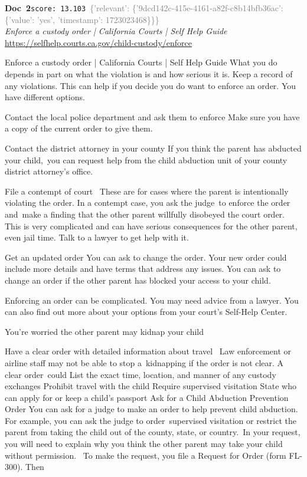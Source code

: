 \documentclass[a4paper,11pt]{article}
\begin{document}
\begin{docenv}
{\footnotesize\textcolor{doccolor}{\textbf{Doc~2}}}\hfill{\tiny\texttt{score:~13.103}}\ {\tiny\textcolor{gray}{\{'relevant': \{'9dcd142c-415e-4161-a82f-c8b14bfb36ac': \{'value': 'yes', 'timestamp': 1723023468\}\}\}}}\\[3pt]
{\small\textit{Enforce a custody order | California Courts | Self Help Guide}}\\[2pt]
{\tiny\url{https://selfhelp.courts.ca.gov/child-custody/enforce}}\\[4pt]
{\footnotesize Enforce a custody order | California Courts | Self Help Guide
What you do depends in part on what the violation is and how serious it is. Keep a record of any violations. This can help if you decide you do want to enforce an order. You have different options.

Contact the local police department and ask them to enforce
Make sure you have a copy of the current order to give them. 

Contact the district attorney in your county
If you think the parent has abducted your child, you can request help from the child abduction unit of your county district attorney's office. 

File a contempt of court 
These are for cases where the parent is intentionally violating the order. In a contempt case, you ask the judge to enforce the order and make a finding that the other parent willfully disobeyed the court order. This is very complicated and can have serious consequences for the other parent, even jail time. Talk to a lawyer to get help with it.

Get an updated order
You can ask to change the order. Your new order could include more details and have terms that address any issues. You can ask to change an order if the other parent has blocked your access to your child. 

Enforcing an order can be complicated. You may need advice from a lawyer. You can also find out more about your options from your court's Self-Help Center.

 You're worried the other parent may kidnap your child

 Have a clear order with detailed information about travel 
Law enforcement or airline staff may not be able to stop a kidnapping if the order is not clear. A clear order could
List the exact time, location, and manner of any custody exchanges
Prohibit travel with the child
Require supervised visitation
State who can apply for or keep a child's passport
Ask for a Child Abduction Prevention Order
You can ask for a judge to make an order to help prevent child abduction. For example, you can ask the judge to order supervised visitation or restrict the parent from taking the child out of the county, state, or country. In your request, you will need to explain why you think the other parent may take your child without permission. 
To make the request, you file a Request for Order (form FL-300). Then}
\end{docenv}
\end{document}
